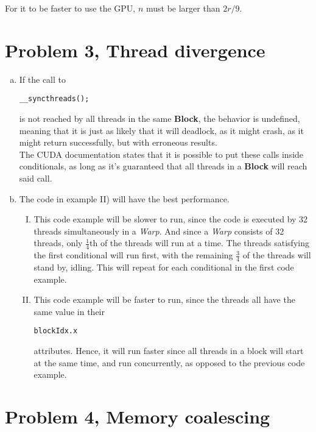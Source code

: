 \documentclass[fontsize=11pt, paper=a4, titlepage]{article}
\begin{document}
For it to be faster to use the GPU, $n$ must be larger than $2r/9$.

\section*{Problem 3, Thread divergence}
\begin{enumerate}[a)]

    \item If the call to
\begin{lstlisting}[numbers=none]
__syncthreads();
\end{lstlisting}
is not reached by all threads in the same \textbf{Block}, the behavior is
undefined, meaning that it is just as likely that it will deadlock, as it might
crash, as it might return successfully, but with erroneous results. \\

The CUDA documentation states that it is possible to put these calls inside
conditionals, as long as it's guaranteed that all threads in a \textbf{Block}
will reach said call.

    \item The code in example II) will have the best performance.

    \begin{enumerate}[I)]

        \item This code example will be slower to run, since the code is
executed by 32 threads simultaneously in a \textit{Warp}. And since a
\textit{Warp} consists of 32 threads, only $\frac{1}{4}$th of the threads will
run at a time. The threads satisfying the first conditional will run first, with
the remaining $\frac{3}{4}$ of the threads will stand by, idling. This will
repeat for each conditional in the first code example.

        \item This code example will be faster to run, since the threads all
have the same value in their \begin{lstlisting}[numbers=none]
blockIdx.x
\end{lstlisting}
attributes. Hence, it will run faster since all threads in a block will start at
the same time, and run concurrently, as opposed to the previous code example.

    \end{enumerate}
\end{enumerate}

\section*{Problem 4, Memory coalescing}
\end{document}
